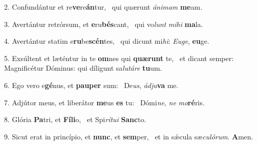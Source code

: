 2. Confundántur et re\textbf{ve}re\textbf{án}tur, \ast\  qui quærunt \textit{á}\textit{ni}\textit{mam} \textbf{me}am.\

3. Avertántur retrórsum, et \textbf{e}ru\textbf{bés}cant, \ast\  qui vo\textit{lunt} \textit{mi}\textit{hi} \textbf{ma}la.\

4. Avertántur statim e\textbf{ru}be\textbf{scén}tes, \ast\  qui dicunt mi\textit{hi}: \textit{Eu}\textit{ge}, \textbf{eu}ge.\

5. Exsúltent et læténtur in te \textbf{om}nes qui \textbf{quæ}\textbf{runt} te, \ast\  et dicant semper: Magnificétur Dóminus: qui díligunt sa\textit{lu}\textit{tá}\textit{re} \textbf{tu}um.\

6. Ego vero e\textbf{gé}nus, et \textbf{pau}\textbf{per} sum: \ast\  De\textit{us}, \textit{ád}\textit{ju}\textbf{va} me.\

7. Adjútor meus, et liberátor \textbf{me}us \textbf{es} tu: \ast\  Dómi\textit{ne}, \textit{ne} \textit{mo}\textbf{ré}ris.\

8. Glória \textbf{Pa}tri, et \textbf{Fí}\textbf{li}o, \ast\  et Spi\textit{rí}\textit{tu}\textit{i} \textbf{Sanc}to.\

9. Sicut erat in princípio, et \textbf{nunc}, et \textbf{sem}per, \ast\  et in sǽcula sæ\textit{cu}\textit{ló}\textit{rum}. \textbf{A}men.\

